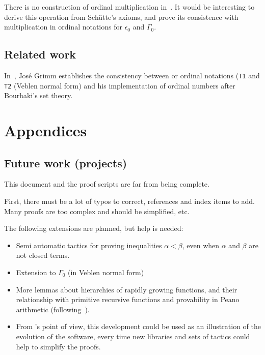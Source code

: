 \documentclass[a4paper]{book}
\begin{document}
{
\begin{project}
There is no construction of ordinal multiplication in~\cite{schutte}. 
It would be interesting to derive this operation from Schütte's axioms,
and prove its consistence with multiplication in ordinal notations for 
$\epsilon_0$ and $\Gamma_0$.
\end{project}

\section{Related work}

In~\cite{grimm:hal-00911710}, José Grimm establishes the consistency between or ordinal notations (\texttt{T1} and \texttt{T2} (Veblen normal form) and his implementation
of ordinal numbers after Bourbaki's set theory.





\chapter{Appendices}




\section{Future work (projects)}

This document and the proof scripts are far from being complete.

First, there must be a lot of typos to correct, references and index items to add. Many proofs are too complex and should be simplified, etc.

The following extensions are planned, but help is needed:

\begin{itemize}
\item Semi automatic tactics for proving inequalities $\alpha < \beta$, even when $\alpha$ and $\beta$ are not closed terms.
\item Extension to $\Gamma_0$ (in Veblen normal form)
\item More lemmas about hierarchies of rapidly growing functions, and their relationship 
    with primitive recursive functions and provability in Peano arithmetic 
(following~\cite{KS81, KP82}).
\item From \coq's point of view, this development could be used as an illustration of the evolution of the software, every time new libraries and sets of tactics could help to simplify the proofs.
\end{itemize}



}
\end{document}
